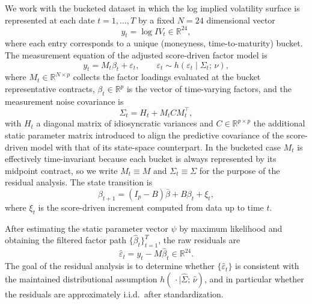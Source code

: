 \documentclass[12pt]{article}
\begin{document}
We work with the bucketed dataset in which the log implied volatility surface is represented
at each date $t = 1, \ldots, T$ by a fixed $N = 24$ dimensional vector
\begin{equation}
    y_t = \log IV_t \in \mathbb{R}^{24},
\end{equation}
where each entry corresponds to a unique (moneyness, time-to-maturity) bucket. The
measurement equation of the adjusted score-driven factor model is
\begin{equation}
    y_t = M_t \beta_t + \varepsilon_t, \qquad
    \varepsilon_t \sim h\!\left(\varepsilon_t \mid \Sigma_t;\, \nu\right),
    \label{eq:measurement}
\end{equation}
where $M_t \in \mathbb{R}^{N \times p}$ collects the factor loadings evaluated at the bucket
representative contracts, $\beta_t \in \mathbb{R}^p$ is the vector of time-varying factors, and
the measurement noise covariance is
\begin{equation}
    \Sigma_t = H_t + M_t C M_t^\top,
    \label{eq:sigma}
\end{equation}
with $H_t$ a diagonal matrix of idiosyncratic variances and $C \in \mathbb{R}^{p \times p}$ the
additional static parameter matrix introduced to align the predictive covariance of the
score-driven model with that of its state-space counterpart. In the bucketed case $M_t$
is effectively time-invariant because each bucket is always represented by its midpoint
contract, so we write $M_t \equiv M$ and $\Sigma_t \equiv \Sigma$ for the purpose of
the residual analysis. The state transition is
\begin{equation}
    \beta_{t+1} = (I_p - B)\bar{\beta} + B\beta_t + \xi_t,
\end{equation}
where $\xi_t$ is the score-driven increment computed from data up to time $t$.

After estimating the static parameter vector $\psi$ by maximum likelihood and obtaining
the filtered factor path $\{\hat{\beta}_t\}_{t=1}^T$, the raw residuals are
\begin{equation}
    \hat{\varepsilon}_t = y_t - M\hat{\beta}_t \in \mathbb{R}^{24}.
\end{equation}
The goal of the residual analysis is to determine whether $\{\hat{\varepsilon}_t\}$ is
consistent with the maintained distributional assumption $h(\,\cdot \mid \hat{\Sigma};\,\hat{\nu})$,
and in particular whether the residuals are approximately i.i.d.\ after standardization.

\end{document}
